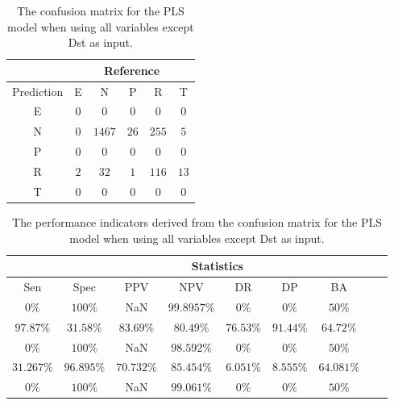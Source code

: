 \begin{table}[!ht]
	\centering
	\begin{tabular}{|c|c|c|c|c|c|}
		\hline
		 & \multicolumn{5}{|c|}{Reference} \\ \hline
		 Prediction & E & N & P & R & T \\ \hline
		 E & $0$ & $0$ & $0$ & $0$ & $0$ \\ \hline
		 N & $0$ & $1467$ & $26$ & $255$ & $5$ \\ \hline
		 P & $0$ & $0$ & $0$ & $0$ & $0$ \\ \hline
		 R & $2$ & $32$ & $1$ & $116$ & $13$ \\ \hline
		 T & $0$ & $0$ & $0$ & $0$ & $0$ \\ \hline
	\end{tabular}
	\caption{The confusion matrix for the PLS model when using all variables except Dst as input.}
	\label{tab:cm:noDst:pls}
\end{table}

\begin{table}[!ht]
	\centering
	\begin{tabular}{|c|c|c|c|c|c|c|c|c|}
		\hline
		 & \multicolumn{7}{c|}{Statistics} \\ \hline
		Sen & Spec & PPV & NPV & DR & DP & BA \\ \hline
		$0\%$ & $100\%$ & NaN & $99.8957\%$ & $0\%$ & $0\%$ & $50\%$ \\ \hline
		$97.87\%$ & $31.58\%$ & $83.69\%$ & $80.49\%$ & $76.53\%$ & $91.44\%$ & $64.72\%$ \\ \hline
		$0\%$ & $100\%$ & NaN & $98.592\%$ & $0\%$ & $0\%$ & $50\%$ \\ \hline
		$31.267\%$ & $96.895\%$ & $70.732\%$ & $85.454\%$ & $6.051\%$ & $8.555\%$ & $64.081\%$ \\ \hline
		$0\%$ & $100\%$ & NaN & $99.061\%$ & $0\%$ & $0\%$ & $50\%$ \\ \hline
	\end{tabular}
	\caption{The performance indicators derived from the confusion matrix for the PLS model when using all variables except Dst as input.}
	\label{tab:cs:noDst:pls}
\end{table}
